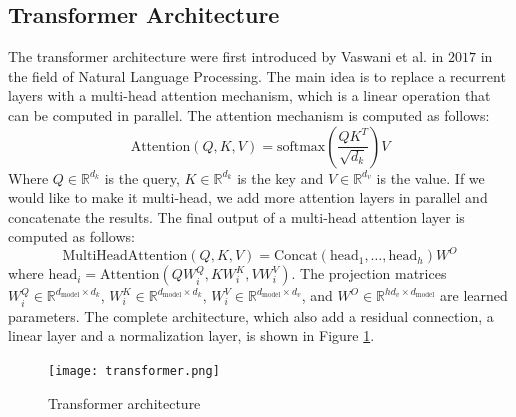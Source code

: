 \subsection{Transformer Architecture}
The transformer architecture were first introduced by Vaswani et al. in $2017$ in the field of Natural Language Processing.
The main idea is to replace a recurrent layers with a multi-head attention
mechanism, which is a linear operation that can be computed in parallel.
The attention mechanism is computed as follows:
\begin{equation}
  \label{eq:attention}
  \text{Attention}(Q,K,V) = \text{softmax}(\frac{QK^T}{\sqrt{d_k}})V
\end{equation}
Where $Q \in \mathbb{R}^{d_k}$ is the query, $K \in \mathbb{R}^{d_k}$ is the key
and $V \in \mathbb{R}^{d_v}$ is the value.
If we would like to make it multi-head, we add more attention layers in parallel
and concatenate the results. The final output of a multi-head attention layer is computed as follows:
\begin{equation}
  \label{eq:multiheadattention}
  \text{MultiHeadAttention}(Q,K,V) = \text{Concat}(\text{head}_1, \dots, \text{head}_h)W^O
\end{equation}
where $\text{head}_i = \text{Attention}(QW_i^Q, KW_i^K, VW_i^V)$.
The projection matrices $W_i^Q \in \mathbb{R}^{d_{\text{model}} \times d_k}$,
$W_i^K \in \mathbb{R}^{d_{\text{model}} \times d_k}$, $W_i^V \in
\mathbb{R}^{d_{\text{model}} \times d_v}$, and $W^O \in \mathbb{R}^{hd_v \times d_\text{model}}$ are learned parameters.
The complete architecture, which also add a residual connection, a linear layer
and a normalization layer, is shown in Figure \ref{fig:transformer}.
\begin{figure}[h]
  \centering
  \texttt{[image: transformer.png]}
  \caption{Transformer architecture}
  \label{fig:transformer}
\end{figure}

